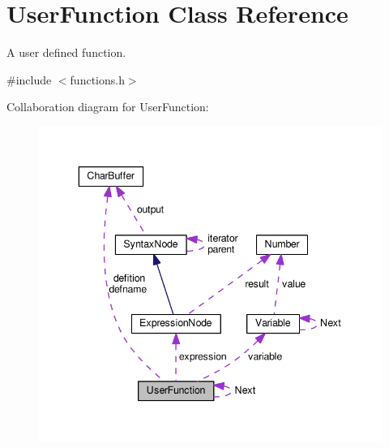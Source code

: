 \hypertarget{classUserFunction}{}\section{User\+Function Class Reference}
\label{classUserFunction}


A user defined function.  




{\ttfamily \#include $<$functions.\+h$>$}



Collaboration diagram for User\+Function\+:
\nopagebreak
\begin{figure}[H]
\begin{center}
\leavevmode
\includegraphics[width=343pt]{d5/d2e/classUserFunction__coll__graph}
\end{center}
\end{figure}
